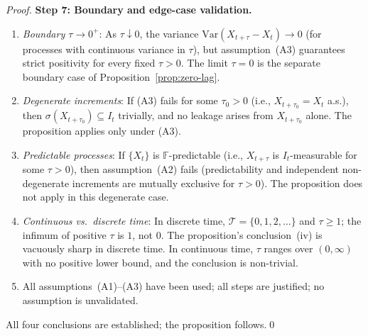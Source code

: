 \documentclass[12pt,openany]{book}
\newcommand{\calI}{\mathcal{I}}
\numberwithin{equation}{chapter}
\theoremstyle{plain}
\theoremstyle{definition}
\theoremstyle{remark}
\numberwithin{equation}{chapter}
\theoremstyle{plain}
\def\calI{I}%
\begin{document}
\begin{proof}
\medskip
\noindent\textbf{Step 7: Boundary and edge-case validation.}
\begin{enumerate}
  \item \emph{Boundary $\tau \to 0^+$}: As $\tau \downarrow 0$,
        the variance $\mathrm{Var}(X_{t+\tau} - X_t) \to 0$
        (for processes with continuous variance in $\tau$), but
        assumption~(A3) guarantees strict positivity for every
        fixed $\tau > 0$.  The limit $\tau = 0$ is the
        separate boundary case of
        Proposition~\ref{prop:zero-lag}.
  \item \emph{Degenerate increments}: If (A3) fails for some
        $\tau_0 > 0$ (i.e., $X_{t+\tau_0} = X_t$ a.s.), then
        $\sigma(X_{t+\tau_0}) \subseteq \calI_t$ trivially, and
        no leakage arises from $X_{t+\tau_0}$ alone.  The
        proposition applies only under (A3).
  \item \emph{Predictable processes}: If $\{X_t\}$ is
        $\mathbb{F}$-predictable (i.e., $X_{t+\tau}$ is
        $\calI_t$-measurable for some $\tau > 0$), then
        assumption~(A2) fails (predictability and independent
        non-degenerate increments are mutually exclusive for
        $\tau > 0$).  The proposition does not apply in this
        degenerate case.
  \item \emph{Continuous vs.\ discrete time}: In discrete time,
        $\mathcal{T} = \{0, 1, 2, \ldots\}$ and $\tau \geq 1$;
        the infimum of positive $\tau$ is $1$, not $0$.  The
        proposition's conclusion~(iv) is vacuously sharp in
        discrete time.  In continuous time, $\tau$ ranges over
        $(0, \infty)$ with no positive lower bound, and the
        conclusion is non-trivial.
  \item All assumptions~(A1)--(A3) have been used; all steps are
        justified; no assumption is unvalidated.
\end{enumerate}

All four conclusions are established; the proposition follows.\qed
\end{proof}
\end{document}
